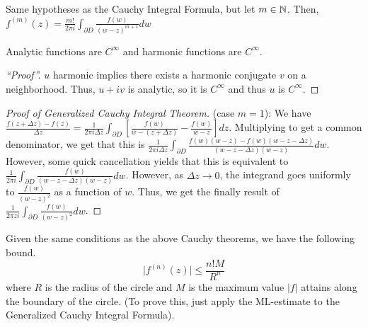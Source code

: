 \documentclass[11pt,leqno,oneside]{amsart}
\numberwithin{thm}{section}
\begin{document}
  \begin{thm}
    Same hypotheses as the Cauchy Integral Formula, but let $m \in
    {\mathbb N}$. Then, $f^{(m)}(z) = \frac{m!}{2 \pi i} \int_{\partial D} \frac{f(w)}{(w-z)^{m+1}}dw$
  \end{thm}
  \begin{cor}
    Analytic functions are $C^{\infty}$ and harmonic functions are $C^{\infty}$.
  \end{cor}
  \begin{proof}[``Proof'']
    $u$ harmonic implies there exists a harmonic conjugate $v$ on a
    neighborhood. Thus, $u+iv$ is analytic, so it is $C^{\infty}$ and
    thus $u$ is $C^{\infty}$.
  \end{proof}
  \begin{proof}[Proof of Generalized Cauchy Integral Theorem]
    (case $m=1$): We have $\frac{f(z+\Delta z)-f(z)}{\Delta z} =
    \frac{1}{2 \pi i \Delta z} \int_{\partial D} \left[
      \frac{f(w)}{w-(z+\Delta z)} - \frac{f(w)}{w-z} \right]
    dz$. Multiplying to get a common denominator, we get that this is
    $\frac{1}{2 \pi i \Delta z}\int_{\partial
      D}\frac{f(w)(w-z)-f(w)(w-z-\Delta z)}{(w-z-\Delta
      z)(w-z)}dw$. However, some quick cancellation yields that this
    is equivalent to $\frac{1}{2 \pi i} \int_{\partial D}
    \frac{f(w)}{(w-z-\Delta z)(w-z)}dw$. However, as $\Delta z \to 0$,
    the integrand goes uniformly to $\frac{f(w)}{(w-z)^2}$ as a
    function of $w$. Thus, we get the finally result of $\frac{1}{2 \pi
z    i} \int_{\partial D} \frac{f(w)}{(w-z)^2}dw$.
  \end{proof}
  \begin{thm}
    Given the same conditions as the above Cauchy theorems, we have the following bound.
    $$ \lvert f^{(n)}(z) \rvert \leq \frac{n!M}{R^n}$$
    where $R$ is the radius of the circle and $M$ is the maximum value $|f|$ attains along the boundary of the circle.  (To prove this, just apply the ML-estimate to the Generalized Cauchy Integral Formula).
  \end{thm}
\end{document}
